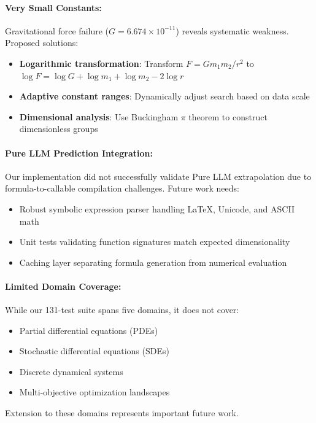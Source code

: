 \documentclass[twoside,11pt]{article}
\begin{document}
\paragraph{Very Small Constants:} Gravitational force failure ($G = 6.674 \times 10^{-11}$) reveals systematic weakness. Proposed solutions:
\begin{itemize}
\item \textbf{Logarithmic transformation}: Transform $F = Gm_1m_2/r^2$ to $\log F = \log G + \log m_1 + \log m_2 - 2\log r$
\item \textbf{Adaptive constant ranges}: Dynamically adjust search based on data scale
\item \textbf{Dimensional analysis}: Use Buckingham $\pi$ theorem to construct dimensionless groups
\end{itemize}

\paragraph{Pure LLM Prediction Integration:} Our implementation did not successfully validate Pure LLM extrapolation due to formula-to-callable compilation challenges\citep{kambhampati2024llms}. Future work needs:
\begin{itemize}
\item Robust symbolic expression parser handling LaTeX, Unicode, and ASCII math
\item Unit tests validating function signatures match expected dimensionality
\item Caching layer separating formula generation from numerical evaluation
\end{itemize}

\paragraph{Limited Domain Coverage:} While our 131-test suite spans five domains, it does not cover:
\begin{itemize}
\item Partial differential equations (PDEs)
\item Stochastic differential equations (SDEs)
\item Discrete dynamical systems
\item Multi-objective optimization landscapes
\end{itemize}

Extension to these domains represents important future work.
\end{document}
